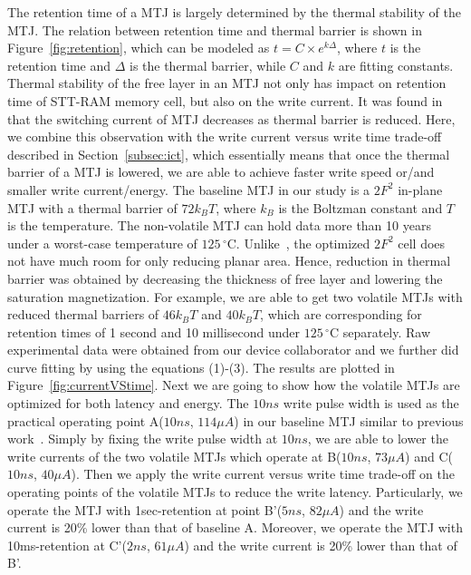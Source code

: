The retention time of a MTJ is largely determined by the thermal stability of the MTJ. The relation
between retention time and thermal barrier is shown in Figure~\ref{fig:retention}, which can be
modeled as $t=C\times e^{k\Delta}$, where $t$ is the retention time and $\Delta$ is the thermal
barrier, while $C$ and $k$ are fitting constants. Thermal stability of the free layer in an MTJ not
only has impact on retention time of STT-RAM memory cell, but also on the write current. It was found
in~\cite{PMTJ:Toshiba08} that the switching current of MTJ decreases as thermal barrier is reduced. Here, we combine this observation with the write current versus write time trade-off described in Section~\ref{subsec:ict}, which essentially means that once the thermal barrier of a MTJ is lowered, we are able to achieve faster write speed or/and smaller write current/energy. The baseline MTJ in our study is a $2F^2$ in-plane MTJ with a thermal barrier of $72k_{B}T$, where $k_{B}$ is the Boltzman constant and $T$ is the temperature. The non-volatile MTJ can hold data more than 10 years under a worst-case temperature of $125\,^{\circ}\mathrm{C}$. Unlike~\cite{STTRAM:HPCA11}, the optimized $2F^2$ cell does not have much room for only reducing planar area. Hence, reduction in thermal barrier was obtained by decreasing the thickness of free layer and lowering the saturation magnetization. For example, we are able to get two volatile MTJs with reduced thermal barriers of $46k_{B}T$ and $40k_{B}T$, which are corresponding for retention times of 1 second and 10 millisecond under $125\,^{\circ}\mathrm{C}$ separately. Raw experimental data were obtained from our device collaborator and we further did curve fitting by using the equations (1)-(3). The results are plotted in Figure~\ref{fig:currentVStime}. Next we are going to show how the volatile MTJs are optimized for both latency and energy. The $10ns$ write pulse width is used as the practical operating point A($10ns$, $114\mu A$) in our baseline MTJ similar to previous work~\cite{CACTI:DAC08:Dong}. Simply by fixing the write pulse width at $10ns$, we are able to lower the write currents of the two volatile MTJs which operate at B($10ns$, $73\mu A$) and C($10ns$, $40\mu A$). Then we apply the write current versus write time trade-off on the operating points of the volatile MTJs to reduce the write latency. Particularly, we operate the MTJ with 1sec-retention at point B'($5ns$, $82\mu A$) and the write current is 20\% lower than that of baseline A. Moreover, we operate the MTJ with 10ms-retention at C'($2ns$, $61\mu A$) and the write current is 20\% lower than that of B'.

